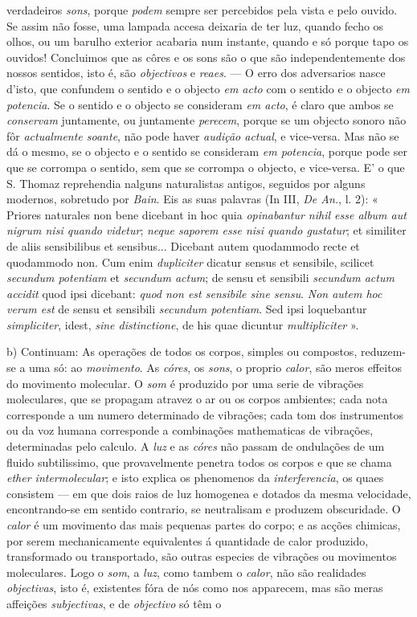 verdadeiros \emph{sons}, porque \emph{podem} sempre ser percebidos pela vista e pelo ouvido. Se assim não fosse, uma lampada accesa deixaria de ter luz, quando fecho os olhos, ou um barulho exterior acabaria num instante, quando e só porque tapo os ouvidos! Concluimos que as côres e os sons são o que são independentemente dos nossos sentidos, isto é, são \emph{objectivos} e \emph{reaes}. --- O erro dos adversarios nasce d'isto, que confundem o sentido e o objecto \emph{em acto} com o sentido e o objecto \emph{em potencia}. Se o sentido e o objecto se consideram \emph{em acto}, é claro que ambos se \emph{conservam} juntamente, ou juntamente \emph{perecem}, porque se um objecto sonoro não fôr \emph{actualmente soante}, não pode haver \emph{audição actual}, e vice-versa. Mas não se dá o mesmo, se o objecto e o sentido se consideram \emph{em potencia}, porque pode ser que se corrompa o sentido, sem que se corrompa o objecto, e vice-versa. E' o que S. Thomaz reprehendia nalguns naturalistas antigos, seguidos por alguns modernos, sobretudo por \emph{Bain}. Eis as suas palavras (In III, \emph{De An.}, l. 2): « Priores naturales non bene dicebant in hoc quia \emph{opinabantur nihil esse album aut nigrum nisi quando videtur}; \emph{neque saporem esse nisi quando gustatur}; et similiter de aliis sensibilibus et sensibus... Dicebant autem quodammodo recte et quodammodo non. Cum enim \emph{dupliciter} dicatur sensus et sensibile, scilicet \emph{secundum potentiam} et \emph{secundum actum}; de sensu et sensibili \emph{secundum actum accidit} quod ipsi dicebant: \emph{quod non est sensibile sine sensu}. \emph{Non autem hoc verum est} de sensu et sensibili \emph{secundum potentiam}. Sed ipsi loquebantur \emph{simpliciter}, idest, \emph{sine distinctione}, de his quae dicuntur \emph{multipliciter} ».\par b) Continuam: As operações de todos os corpos, simples ou compostos, reduzem-se a uma só: ao \emph{movimento}. As \emph{córes}, os \emph{sons}, o proprio \emph{calor}, são meros effeitos do movimento molecular. O \emph{som} é produzido por uma serie de vibrações moleculares, que se propagam atravez o ar ou os corpos ambientes; cada nota corresponde a um numero determinado de vibrações; cada tom dos instrumentos ou da voz humana corresponde a combinações mathematicas de vibrações, determinadas pelo calculo. A \emph{luz} e as \emph{córes} não passam de ondulações de um fluido subtilissimo, que provavelmente penetra todos os corpos e que se chama \emph{ether intermolecular}; e isto explica os phenomenos da \emph{interferencia}, os quaes consistem --- em que dois raios de luz homogenea e dotados da mesma velocidade, encontrando-se em sentido contrario, se neutralisam e produzem obscuridade. O \emph{calor} é um movimento das mais pequenas partes do corpo; e as acções chimicas, por serem mechanicamente equivalentes á quantidade de calor produzido, transformado ou transportado, são outras especies de vibrações ou movimentos moleculares. Logo o \emph{som}, a \emph{luz}, como tambem o \emph{calor}, não são realidades \emph{objectivas}, isto é, existentes fóra de nós como nos apparecem, mas são meras affeições \emph{subjectivas}, e de \emph{objectivo} só têm o 